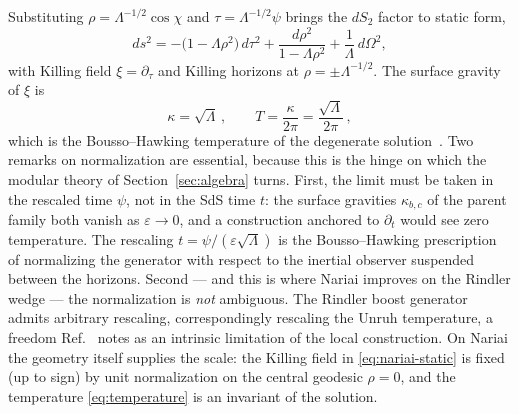 \documentclass[11pt]{article}
\newcommand{\Nariai}{Nariai}
\begin{document}
Substituting $\rho = \Lambda^{-1/2}\cos\chi$ and $\tau = \Lambda^{-1/2}\psi$ brings the $dS_2$ factor to static form,
\begin{equation}
ds^2 = -\big(1-\Lambda\rho^2\big)\,d\tau^2 + \frac{d\rho^2}{1-\Lambda\rho^2} + \frac{1}{\Lambda}\,d\Omega^2 ,
\label{eq:nariai-static}
\end{equation}
with Killing field $\xi = \partial_\tau$ and Killing horizons at $\rho = \pm \Lambda^{-1/2}$. The surface gravity of $\xi$ is
\begin{equation}
\kappa = \sqrt{\Lambda}\,,
\qquad
T = \frac{\kappa}{2\pi} = \frac{\sqrt{\Lambda}}{2\pi}\,,
\label{eq:temperature}
\end{equation}
which is the Bousso--Hawking temperature of the degenerate solution~\cite{BoussoHawking}. Two remarks on normalization are essential, because this is the hinge on which the modular theory of Section~\ref{sec:algebra} turns. First, the limit must be taken in the rescaled time $\psi$, not in the SdS time $t$: the surface gravities $\kappa_{b,c}$ of the parent family both vanish as $\varepsilon \to 0$, and a construction anchored to $\partial_t$ would see zero temperature. The rescaling $t = \psi/(\varepsilon\sqrt{\Lambda})$ is the Bousso--Hawking prescription of normalizing the generator with respect to the inertial observer suspended between the horizons. Second --- and this is where \Nariai{} improves on the Rindler wedge --- the normalization is \emph{not} ambiguous. The Rindler boost generator admits arbitrary rescaling, correspondingly rescaling the Unruh temperature, a freedom Ref.~\cite{DorauMuch} notes as an intrinsic limitation of the local construction. On \Nariai{} the geometry itself supplies the scale: the Killing field in \eqref{eq:nariai-static} is fixed (up to sign) by unit normalization on the central geodesic $\rho = 0$, and the temperature \eqref{eq:temperature} is an invariant of the solution.
\end{document}
